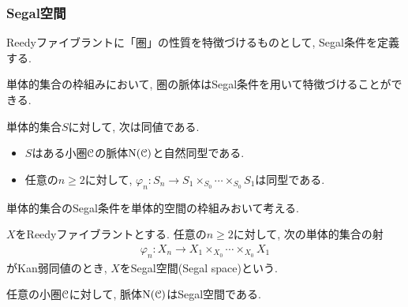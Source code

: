 \documentclass[aspectratio=169, dvipdfmx, 8pt, notheorems, uplatex]{beamer}
\begin{document}
\begin{frame}
  \frametitle{Segal空間}

  Reedyファイブラントに「圏」の性質を特徴づけるものとして, Segal条件を定義する. 

  単体的集合の枠組みにおいて, 圏の脈体はSegal条件を用いて特徴づけることができる. 

  \begin{theorem}
    単体的集合$S$に対して, 次は同値である. 
    \begin{itemize}
      \item $S$はある小圏$\mathcal{C}$の脈体$\mathrm{N}(\mathcal{C})$と自然同型である. 
      \item 任意の$n \geq 2$に対して, $\varphi_n : S_n \to S_1 \times_{S_0} \cdots \times_{S_0} S_1$は同型である. 
    \end{itemize}
  \end{theorem}

  単体的集合のSegal条件を単体的空間の枠組みおいて考える. 

  \begin{definition}[Segal空間]
    $X$をReedyファイブラントとする. 
    任意の$n \geq 2$に対して, 次の単体的集合の射 
    \begin{align*}
      \varphi_n : X_n \to X_1 \times_{X_0} \cdots \times_{X_0} X_1
    \end{align*}
    がKan弱同値のとき, $X$をSegal空間(Segal space)という. 
  \end{definition}

  \begin{example}
    任意の小圏$\mathcal{C}$に対して, 脈体$\mathrm{N}(\mathcal{C})$はSegal空間である. 
  \end{example}

\end{frame}
\end{document}
